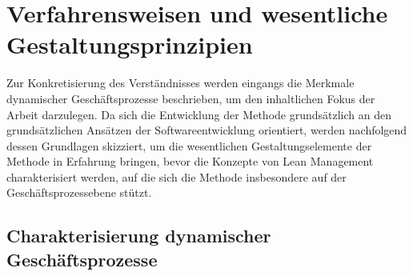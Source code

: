 \section{Verfahrensweisen und wesentliche Gestaltungsprinzipien}\label{sec:methodenGrundlage}
Zur Konkretisierung des Verständnisses werden eingangs die Merkmale dynamischer Geschäftsprozesse beschrieben, um den inhaltlichen Fokus der Arbeit darzulegen.
Da sich die Entwicklung der Methode grundsätzlich an den grundsätzlichen Ansätzen der Softwareentwicklung orientiert, werden nachfolgend dessen Grundlagen skizziert, um die wesentlichen Gestaltungselemente der Methode in Erfahrung bringen, bevor die Konzepte von Lean Management charakterisiert werden, auf die sich die Methode insbesondere auf der Geschäftsprozessebene stützt.


\cite{Grauer.2010}

\subsection{Charakterisierung dynamischer Geschäftsprozesse}

